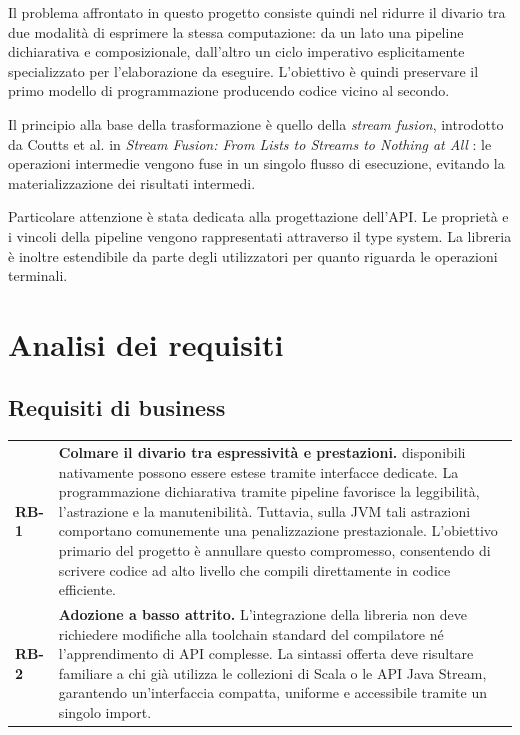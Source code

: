 \documentclass[a4paper,11pt]{report}
\theoremstyle{definition}
\begin{document}
Il problema affrontato in questo progetto consiste quindi nel ridurre il divario tra due modalità di esprimere la stessa computazione: da un lato una pipeline dichiarativa e composizionale, dall'altro un ciclo imperativo esplicitamente specializzato per l'elaborazione da eseguire. L'obiettivo è quindi preservare il primo modello di programmazione producendo codice vicino al secondo.

Il principio alla base della trasformazione è quello della \emph{stream fusion}, introdotto da Coutts et al. in \emph{Stream Fusion: From Lists to Streams to Nothing at All} \cite{coutts2007stream}: le operazioni intermedie vengono fuse in un singolo flusso di esecuzione, evitando la materializzazione dei risultati intermedi.

Particolare attenzione è stata dedicata alla progettazione dell'API. Le proprietà e i vincoli della pipeline vengono rappresentati attraverso il type system. La libreria è inoltre estendibile da parte degli utilizzatori per quanto riguarda le operazioni terminali.

\chapter{Analisi dei requisiti}
\label{chap:requisiti}

\section{Requisiti di business}

\begin{longtable}{@{}p{}p{}@{}}
  \textbf{RB-1} &
  \textbf{Colmare il divario tra espressività e prestazioni.}
  disponibili nativamente possono essere estese tramite interfacce dedicate.
  La programmazione dichiarativa tramite pipeline favorisce la leggibilità, l'astrazione e la manutenibilità. Tuttavia, sulla JVM tali astrazioni comportano comunemente una penalizzazione prestazionale. L'obiettivo primario del progetto è annullare questo compromesso, consentendo di scrivere codice ad alto livello che compili direttamente in codice efficiente.
  \\[0.5em]

  \textbf{RB-2} &
  \textbf{Adozione a basso attrito.}
  L'integrazione della libreria non deve richiedere modifiche alla toolchain standard del compilatore né l'apprendimento di API complesse. La sintassi offerta deve risultare familiare a chi già utilizza le collezioni di Scala o le API Java Stream, garantendo un'interfaccia compatta, uniforme e accessibile tramite un singolo import.
\end{longtable}
\end{document}
